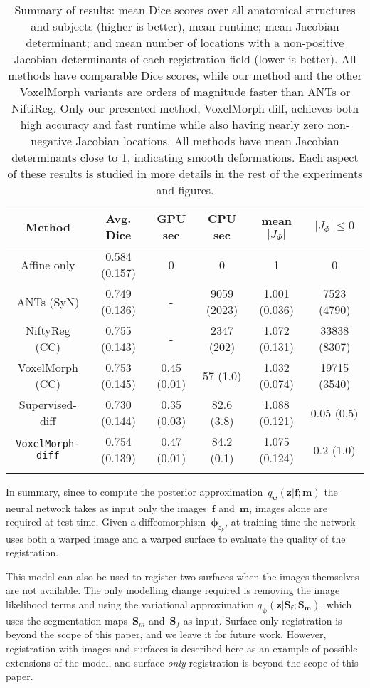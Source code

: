 \documentclass{article}
\newcommand{\bS}{\boldsymbol{S}}
\newcommand{\bphi}{\boldsymbol{\phi}}
\newcommand{\bpsi}{\boldsymbol{\psi}}
\newcommand{\bz}{\boldsymbol{z}}
\newcommand{\bmoving}{\boldsymbol{m}}
\newcommand{\bfixed}{\boldsymbol{f}}
\begin{document}
\begin{table*}[h!]
	\small
	\centering
\color{blue}
	\begin{tabular}{c c c c c c}
		Method&Avg. Dice&GPU sec&CPU sec & mean $|J_\Phi|$ & $|J_\Phi| \le 0$    \\
		\hline
		Affine only&0.584 (0.157)&0 &0  & 1 & 0  \\
		ANTs (SyN) &0.749 (0.136)&-&9059 (2023) & 1.001 (0.036) & 7523 (4790)\\
		NiftyReg (CC) &0.755 (0.143)&-&2347 (202) & 1.072 (0.131)  & 33838 (8307) \\
		VoxelMorph (CC) & 0.753 (0.145) & 0.45 (0.01) & 57 (1.0) & 1.032 (0.074) & 19715 (3540)   \\ 
		Supervised-diff & 0.730 (0.144) & 0.35 (0.03) & 82.6 (3.8)        & 1.088 (0.121) & 0.05 (0.5)   \\ 
		\hline
\verb|VoxelMorph-diff| & 0.754 (0.139) & 0.47 (0.01)& 84.2 (0.1) & 1.075 (0.124) & 0.2 (1.0)   \\
		\hline  
		\vspace{-0.5cm}
	\end{tabular}
\caption{\color{blue} Summary of results: mean Dice scores over all anatomical structures and subjects (higher is better), mean runtime; mean Jacobian determinant; and mean number of locations with a non-positive Jacobian determinants of each registration field (lower is better). All methods have comparable Dice scores, while our method and the other VoxelMorph variants are orders of magnitude faster than ANTs or NiftiReg. Only our presented method, VoxelMorph-diff,
achieves both high accuracy and fast runtime while also having nearly zero non-negative Jacobian locations. All methods have mean Jacobian determinants close to 1, indicating smooth deformations.
Each aspect of these results is studied in more details in the rest of the experiments and figures.
	}
	\label{tbl:results}
\end{table*} 


In summary, since to compute the posterior approximation~$q_{\bpsi}(\bz|\bfixed; \bmoving)$ the neural network takes as input only the images~$\bfixed$ and~$\bmoving$, images alone are required at test time. Given a diffeomorphism~$\bphi_{z_k}$, at training time the network uses both a warped image and a warped surface to evaluate the quality of the registration. 

This model can also be used to register two surfaces when the images themselves are not available. The only modelling change required is removing the image likelihood terms and using the variational approximation $q_{\bpsi}(\bz|\bS_{\bfixed}; \bS_{\bmoving})$, which uses the segmentation maps~$\bS_m$ and~$\bS_f$ as input. Surface-only registration is beyond the scope of this paper, and we leave it for future work. {\color{blue}However, registration with images and surfaces is described here as an example of possible extensions of the model, and surface-\textit{only} registration is beyond the scope of this paper. }
\end{document}
